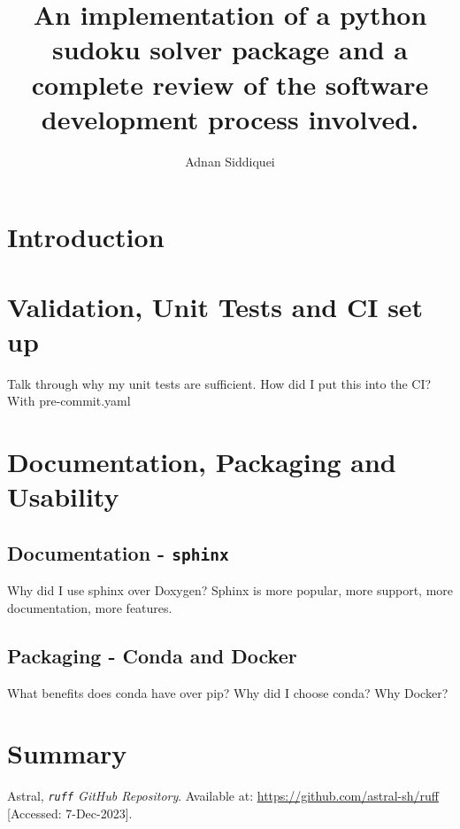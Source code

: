 \documentclass[a4paper,11pt]{article}
\title{\boldmath An implementation of a python sudoku solver package and a complete review of the software development
process involved.}
\author{Adnan Siddiquei}
\affiliation{University of Cambridge}
\newcommand{\inlinecode}[1]{\lstinline{#1}}
\begin{document}
\maketitle
\flushbottom

\section{Introduction}\label{sec:intro}






\section{Validation, Unit Tests and CI set up}\label{sec:validation-unit-tests-and-ci-set-up}
Talk through why my unit tests are sufficient.
How did I put this into the CI? With pre-commit.yaml


\section{Documentation, Packaging and Usability}\label{sec:documentation-packaging-and-usability}
\subsection{Documentation - \inlinecode{sphinx}}\label{subsec:documentation-sphinx}
Why did I use sphinx over Doxygen? Sphinx is more popular, more support, more documentation, more features.

\subsection{Packaging - Conda and Docker}\label{subsec:packaging-pypi}
What benefits does conda have over pip? Why did I choose conda?
Why Docker?

\section{Summary}
\label{sec:conclusion}


\begin{thebibliography}{99}

Astral,
\textit{\inlinecode{ruff} GitHub Repository}.
Available at: \url{https://github.com/astral-sh/ruff}
[Accessed: 7-Dec-2023].
\end{thebibliography}
\end{document}
